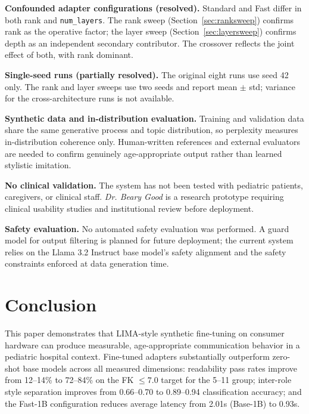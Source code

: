 \documentclass[AMA,Times1COL]{WileyNJDv5} %
\begin{document}
\textbf{Confounded adapter configurations (resolved).} Standard and Fast differ in both rank and \texttt{num\_layers}. The rank sweep (Section~\ref{sec:ranksweep}) confirms rank as the operative factor; the layer sweep (Section~\ref{sec:layersweep}) confirms depth as an independent secondary contributor. The crossover reflects the joint effect of both, with rank dominant.

\textbf{Single-seed runs (partially resolved).} The original eight runs use seed 42 only. The rank and layer sweeps use two seeds and report mean $\pm$ std; variance for the cross-architecture runs is not available.

\textbf{Synthetic data and in-distribution evaluation.} Training and validation data share the same generative process and topic distribution, so perplexity measures in-distribution coherence only. Human-written references and external evaluators are needed to confirm genuinely age-appropriate output rather than learned stylistic imitation.

\textbf{No clinical validation.} The system has not been tested with pediatric patients, caregivers, or clinical staff. \textit{Dr. Beary Good} is a research prototype requiring clinical usability studies and institutional review before deployment.

\textbf{Safety evaluation.} No automated safety evaluation was performed. A guard model for output filtering is planned for future deployment; the current system relies on the Llama 3.2 Instruct base model's safety alignment and the safety constraints enforced at data generation time.

\section{Conclusion}

This paper demonstrates that LIMA-style synthetic fine-tuning on consumer hardware can produce measurable, age-appropriate communication behavior in a pediatric hospital context. Fine-tuned adapters substantially outperform zero-shot base models across all measured dimensions: readability pass rates improve from 12--14\% to 72--84\% on the FK $\leq 7.0$ target for the 5--11 group; inter-role style separation improves from 0.66--0.70 to 0.89--0.94 classification accuracy; and the Fast-1B configuration reduces average latency from 2.01s (Base-1B) to 0.93s.
\end{document}
